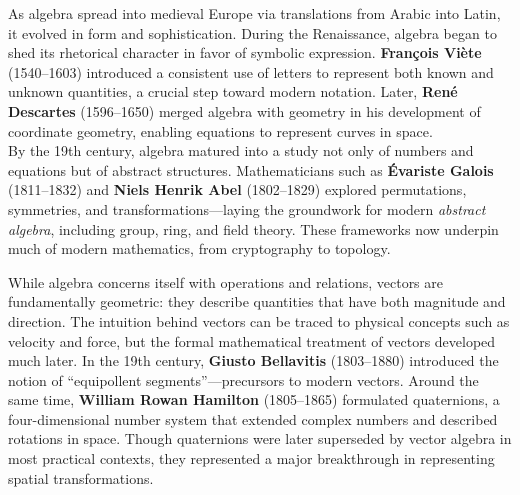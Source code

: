 \documentclass{book}
\begin{document}
As algebra spread into medieval Europe via translations from Arabic into Latin, it evolved in form and sophistication. During the Renaissance, algebra began to shed its rhetorical character in favor of symbolic expression. \textbf{François Viète} (1540--1603) introduced a consistent use of letters to represent both known and unknown quantities, a crucial step toward modern notation. Later, \textbf{René Descartes} (1596--1650) merged algebra with geometry in his development of coordinate geometry, enabling equations to represent curves in space.\\

By the 19th century, algebra matured into a study not only of numbers and equations but of abstract structures. Mathematicians such as \textbf{Évariste Galois} (1811--1832) and \textbf{Niels Henrik Abel} (1802--1829) explored permutations, symmetries, and transformations---laying the groundwork for modern \emph{abstract algebra}, including group, ring, and field theory. These frameworks now underpin much of modern mathematics, from cryptography to topology.

While algebra concerns itself with operations and relations, vectors are fundamentally geometric: they describe quantities that have both magnitude and direction. The intuition behind vectors can be traced to physical concepts such as velocity and force, but the formal mathematical treatment of vectors developed much later. In the 19th century, \textbf{Giusto Bellavitis} (1803--1880) introduced the notion of ``equipollent segments''---precursors to modern vectors. Around the same time, \textbf{William Rowan Hamilton} (1805--1865) formulated quaternions, a four-dimensional number system that extended complex numbers and described rotations in space. Though quaternions were later superseded by vector algebra in most practical contexts, they represented a major breakthrough in representing spatial transformations.\\
\end{document}
